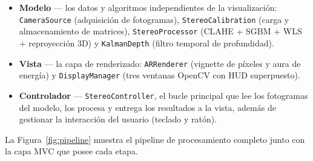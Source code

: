 \documentclass[12pt, a4paper]{article}
\begin{document}
\begin{itemize}[leftmargin=2em]
  \item \textbf{Modelo} — los datos y algoritmos independientes de la visualización:
        \texttt{CameraSource} (adquisición de fotogramas), \texttt{StereoCalibration}
        (carga y almacenamiento de matrices), \texttt{StereoProcessor}
        (CLAHE + SGBM + WLS + reproyección 3D) y \texttt{KalmanDepth}
        (filtro temporal de profundidad).
  \item \textbf{Vista} — la capa de renderizado: \texttt{ARRenderer}
        (vignette de píxeles y aura de energía) y \texttt{DisplayManager}
        (tres ventanas OpenCV con HUD superpuesto).
  \item \textbf{Controlador} — \texttt{StereoController}, el bucle principal que lee
        los fotogramas del modelo, los procesa y entrega los resultados a la vista,
        además de gestionar la interacción del usuario (teclado y ratón).
\end{itemize}

La Figura~\ref{fig:pipeline} muestra el pipeline de procesamiento completo junto con
la capa MVC que posee cada etapa.
\end{document}
